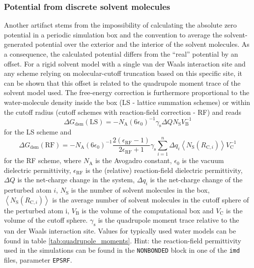 \subsubsection{Potential from discrete solvent molecules}
Another artifact stems from the impossibility of calculating the
absolute zero potential in a periodic simulation box and the
convention to average the solvent-generated potential over the
exterior and the interior of the solvent molecules. As a consequence,
the calculated potential differs from the ``real'' potential by an
offset. For a rigid solvent model with a single van der Waals
interaction site and any scheme relying on molecular-cutoff truncation
based on this specific site, it can be shown that this offset is
related to the quadrupole moment trace of the solvent model used. The
free-energy correction is furthermore proportional to the
water-molecule density inside the box (LS - lattice summation schemes)
or within the cutoff radius (cutoff schemes with reaction-field
correction - RF) and reads
\begin{equation}
  \Delta G_{\text{dsm}}(\text{LS}) = -N_{\text{A}} (6 \epsilon_0)^{-1} \gamma_{\text{s}} \Delta Q N_{\text{S}} V_{\text{B}}^{-1}
\end{equation}
for the LS scheme and
\begin{equation} \label{equ:dsm}
  \Delta G_{\text{dsm}}(\text{RF}) = -N_{\text{A}} (6 \epsilon_0)^{-1} \frac{2 (\epsilon_{\text{RF}}-1)}{2\epsilon_{\text{RF}}+1} \gamma_{\text{s}} \sum_{i=1}^n \Delta q_i \left\langle N_{\text{S}}(R_{\text{C},i})\right\rangle V_{\text{C}}^{-1}
\end{equation}
for the RF scheme, where $N_{\text{A}}$ is the Avogadro constant, $\epsilon_0$
is the vacuum dielectric permittivity, $\epsilon_{\text{RF}}$ is the (relative)
reaction-field dielectric permittivity, $\Delta Q$ is the net-charge
change in the system, $\Delta q_i$ is the net-charge change of the perturbed atom $i$, $N_{\text{S}}$ is the number of solvent molecules in the
box, $\left\langle N_{\text{S}}(R_{\text{C},i})\right\rangle$ is the average number of
solvent molecules in the cutoff sphere of the perturbed atom i, $V_{\text{B}}$ is the volume of the
computational box and $V_{\text{C}}$ is the volume of the cutoff
sphere. $\gamma_{\text{s}}$ is the quadrupole moment trace relative to the van
der Waals interaction site. Values for typically used water models can be found in
table \ref{tab:quadrupole_moments}. Hint: the reaction-field permittivity used in the simulations can be found in the \texttt{NONBONDED} block in one of the \texttt{imd} files, parameter \texttt{EPSRF}.

